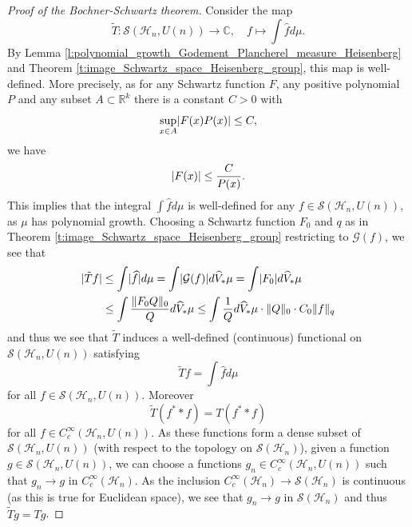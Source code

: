 \documentclass[12pt,reqno,a4paper]{amsart}
\theoremstyle{theorem}
\theoremstyle{definition}
\numberwithin{theorem}{section}
\numberwithin{equation}{section}
\newcommand{\R}{\mathbb{R}}
\newcommand{\C}{\mathbb{C}}
\DeclarePairedDelimiter{\norm}{\lVert}{\rVert}
\DeclarePairedDelimiter{\abs}{\lvert}{\rvert}
\begin{document}
\begin{proof}[Proof of the Bochner-Schwartz theorem]
	Consider the map
	\[\tilde{T}:\mathscr{S}(\mathcal{H}_n,U(n))\to \C,\quad  f\mapsto \int \widehat{f}d\mu.\]
	By Lemma \ref{l:polynomial_growth_Godement_Plancherel_measure_Heisenberg} and Theorem \ref{t:image_Schwartz_space_Heisenberg_group}, this map is well-defined.
	More precisely, as for any Schwartz function $F$, any positive polynomial $P$ and any subset $A\subset \R^k$ there is a constant $C>0$ with \[\sup_{x\in A}\abs{F(x)P(x)}\leq C,\]  we have 
	\[\abs{F(x)}\leq \frac{C}{P(x)}.\] This implies that the integral $\int\widehat{f}d\mu$ is well-defined for any $f\in \mathscr{S}(\mathcal{H}_n, U(n))$, as $\mu$ has polynomial growth.
	Choosing a Schwartz function $F_0$ and $q$ as in Theorem \ref{t:image_Schwartz_space_Heisenberg_group} restricting to $\mathcal{G}(f)$, we see that
	\begin{align*}
		\abs{\tilde{T}f}&\leq \int \abs{\widehat{f}}d\mu = \int \abs{\mathcal{G}(f)}d\widehat{V}_*\mu=\int \abs{F_0}d\widehat{V}_*\mu\\
		&\leq \int \frac{\norm{F_0Q}_0}{Q}d\widehat{V}_*\mu \leq \int \frac{1}{Q}d\widehat{V}_*\mu \cdot\norm{Q}_0\cdot C_0\norm{f}_q
	\end{align*}
	and thus we see that $\tilde{T}$ induces a well-defined (continuous) functional on $\mathscr{S}(\mathcal{H}_n, U(n))$ satisfying
	\[\tilde{T}f = \int \widehat{f}d\mu\]
	for all $f\in \mathscr{S}(\mathcal{H}_n, U(n))$.
	Moreover 
	\[\tilde{T}(f^**f) = T(f^**f)\]
	for all $f\in C_c^\infty(\mathcal{H}_n, U(n))$. As these functions form a dense subset of $\mathscr{S}(\mathcal{H}_n, U(n))$ (with respect to the topology on $\mathscr{S}(\mathcal{H}_n)$), given a function $g\in \mathscr{S}(\mathcal{H}_n, U(n))$, we can choose a functions $g_n\in C_c^\infty(\mathcal{H}_n, U(n))$ such that $g_n\to g$ in $C_c^\infty(\mathcal{H}_n)$.
	As the inclusion $C_c^\infty(\mathcal{H}_n)\to \mathscr{S}(\mathcal{H}_n)$ is continuous (as this is true for Euclidean space), we see that $g_n\to g$ in $\mathscr{S}(\mathcal{H}_n)$ and thus $\tilde{T}g = Tg$.
\end{proof}
\end{document}

